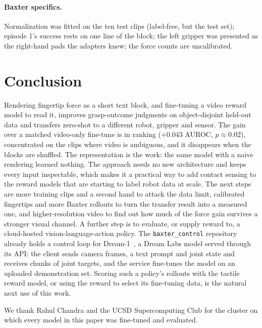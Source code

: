 \documentclass{article}
\begin{document}
\paragraph{Baxter specifics.} Normalization was fitted on the ten test clips (label-free, but the
test set); episode 1's success rests on one line of the block; the left gripper was presented as
the right-hand pads the adapters knew; the force counts are uncalibrated.

\section{Conclusion}

Rendering fingertip force as a short text block, and fine-tuning a video reward model to read it,
improves grasp-outcome judgments on object-disjoint held-out data and transfers zero-shot to a
different robot, gripper and sensor. The gain over a matched video-only fine-tune is in ranking
($+0.043$ AUROC, $p \approx 0.02$), concentrated on the clips where video is ambiguous, and it
disappears when the blocks are shuffled. The representation is the work: the same model with a
naive rendering learned nothing. The approach needs no new architecture and keeps every input
inspectable, which makes it a practical way to add contact sensing to the reward models that are
starting to label robot data at scale. The next steps are more training clips and a second hand
to attack the data limit, calibrated fingertips and more Baxter rollouts to turn the transfer
result into a measured one, and higher-resolution video to find out how much of the force gain
survives a stronger visual channel. A further step is to evaluate, or supply reward to, a
cloud-hosted vision-language-action policy. The \texttt{baxter\_control} repository already
holds a control loop for Dream-1~\cite{dreamlabs2026}, a Dream Labs model served through its
API: the client sends camera frames, a text prompt and joint state and receives chunks of joint
targets, and the service fine-tunes the model on an uploaded demonstration set. Scoring such a
policy's rollouts with the tactile reward model, or using the reward to select its fine-tuning
data, is the natural next use of this work.

\begin{ack}
We thank Rahul Chandra and the UCSD Supercomputing Club for the cluster on which every model in
this paper was fine-tuned and evaluated.
\end{ack}



\end{document}
